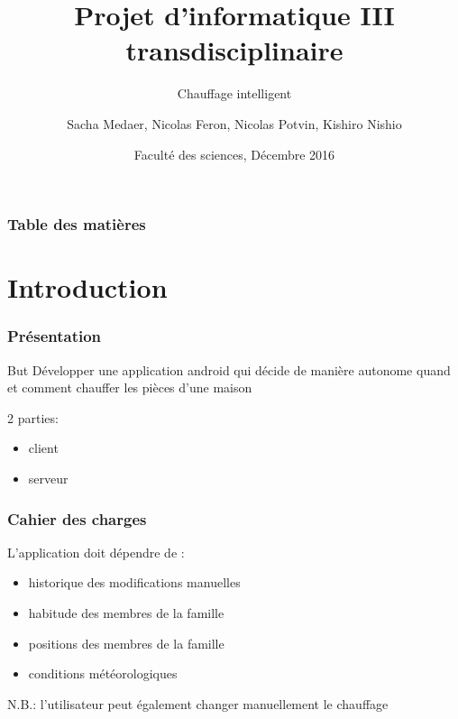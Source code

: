 \documentclass{beamer}
\title%
{Projet d'informatique III transdisciplinaire}
\subtitle{Chauffage intelligent}
\author[Sacha Medaer, Nicolas Feron, Nicolas Potvin, Kishiro Nishio] %
{Sacha Medaer, Nicolas Feron, Nicolas Potvin, Kishiro Nishio}
\date
{Faculté des sciences, Décembre 2016}
\begin{document}
 
\frame{\titlepage}

\begin{frame}
\frametitle{Table des matières}
\tableofcontents
\end{frame}
 
\section{Introduction}
 
\begin{frame}
\frametitle{Présentation}
 \begin{block}{But}
 	Développer une application android qui décide de manière autonome quand et comment chauffer les pièces d'une maison
 \end{block}
 \vspace{10 mm}
 2 parties:
 \begin{itemize}
 \item client
 \item serveur
 \end{itemize}
\end{frame}

\begin{frame}
\frametitle{Cahier des charges}
L'application doit dépendre de :
\begin{itemize}
\item historique des modifications manuelles
\item habitude des membres de la famille 
\item positions des membres de la famille
\item conditions météorologiques
\end{itemize}
N.B.: l'utilisateur peut également changer manuellement le chauffage
\end{frame}
\end{document}
